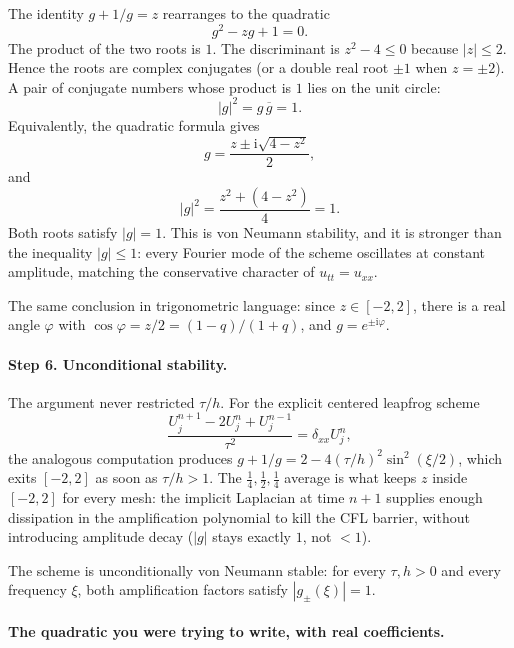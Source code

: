 The identity \(g+1/g=z\) rearranges to the quadratic
\[
g^2-z g+1=0.
\]
The product of the two roots is \(1\). The discriminant is \(z^2-4\le 0\) because \(|z|\le 2\). Hence the roots are complex conjugates (or a double real root \(\pm 1\) when \(z=\pm 2\)). A pair of conjugate numbers whose product is \(1\) lies on the unit circle:
\[
|g|^2
=
g\,\overline{g}
=
1.
\]
Equivalently, the quadratic formula gives
\[
g
=
\frac{z\pm\mathrm i\sqrt{4-z^2}}{2},
\]
and
\[
|g|^2
=
\frac{z^2+(4-z^2)}{4}
=
1.
\]
Both roots satisfy \(|g|=1\). This is von Neumann stability, and it is stronger than the inequality \(|g|\le 1\): every Fourier mode of the scheme oscillates at constant amplitude, matching the conservative character of \(u_{tt}=u_{xx}\).

The same conclusion in trigonometric language: since \(z\in[-2,2]\), there is a real angle \(\varphi\) with \(\cos\varphi=z/2=(1-q)/(1+q)\), and \(g=e^{\pm\mathrm i\varphi}\).

\paragraph{Step 6. Unconditional stability.}

The argument never restricted \(\tau/h\). For the explicit centered leapfrog scheme
\[
\frac{U_j^{n+1}-2U_j^n+U_j^{n-1}}{\tau^2}
=
\delta_{xx}U_j^n,
\]
the analogous computation produces \(g+1/g=2-4(\tau/h)^2\sin^2(\xi/2)\), which exits \([-2,2]\) as soon as \(\tau/h>1\). The \(\frac14,\frac12,\frac14\) average is what keeps \(z\) inside \([-2,2]\) for every mesh: the implicit Laplacian at time \(n+1\) supplies enough dissipation in the amplification polynomial to kill the CFL barrier, without introducing amplitude decay (\(|g|\) stays exactly \(1\), not \(<1\)).

\begin{theorem}
\label{thm:p5-stable}
The scheme is unconditionally von Neumann stable: for every \(\tau,h>0\) and every frequency \(\xi\), both amplification factors satisfy \(|g_\pm(\xi)|=1\).
\end{theorem}

\paragraph{The quadratic you were trying to write, with real coefficients.}

